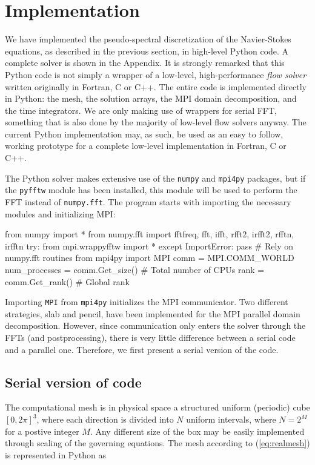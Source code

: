 \documentclass[11pt, oneside]{article}
\begin{document}
\section{Implementation}

We have implemented the pseudo-spectral discretization of the Navier-Stokes equations, as described in the previous section, in high-level Python code. A complete solver is shown in the Appendix. It is strongly remarked that this Python code is not simply a wrapper of a low-level, high-performance \emph{flow solver} written originally in Fortran, C or C++. The entire code is implemented directly in Python: the mesh, the solution arrays, the MPI domain decomposition, and the time integrators. We are only making use of wrappers for serial FFT, something that is also done by the majority of low-level flow solvers anyway. The current Python implementation may, as such, be used as an easy to follow, working prototype for a complete low-level implementation in Fortran, C or C++.

The Python solver makes extensive use of the \texttt{numpy} and \texttt{mpi4py} packages, but if the \texttt{pyfftw} module has been installed, this module will be used to perform the FFT instead of \texttt{numpy.fft}. The program starts with importing the necessary modules and initializing MPI:

\begin{python}
from numpy import *
from numpy.fft import fftfreq, fft, ifft, rfft2, irfft2, rfftn, irfftn
try:
    from mpi.wrappyfftw import *
except ImportError:
    pass # Rely on numpy.fft routines
from mpi4py import MPI
comm = MPI.COMM_WORLD
num_processes = comm.Get_size() # Total number of CPUs
rank = comm.Get_rank()          # Global rank
\end{python}
Importing \texttt{MPI} from \texttt{mpi4py} initializes the MPI communicator. Two different strategies, slab and pencil, have been implemented for the MPI parallel domain decomposition. However, since communication only enters the solver through the FFTs (and postprocessing), there is very little difference between a serial code and a parallel one. Therefore, we first present a serial version of the code.

\subsection{Serial version of code}
The computational mesh is in physical space a structured uniform (periodic) cube $[0, 2\pi]^3$, where each direction is divided into $N$ uniform intervals, where $N=2^M$ for a postive integer $M$. Any different size of the box may be easily implemented through scaling of the governing equations. The mesh according to (\ref{eq:realmesh}) is represented in Python as
\end{document}
